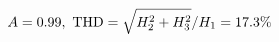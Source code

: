 \documentclass[preview]{standalone}
\begin{document}
\begin{align*}
\special{dvisvgm:raw <g id='unique000'>}A=0.99,\ \text{THD}=\sqrt{H_2^2+H_3^2}/H_1=17.3\%\special{dvisvgm:raw </g>}
\end{align*}
\end{document}
